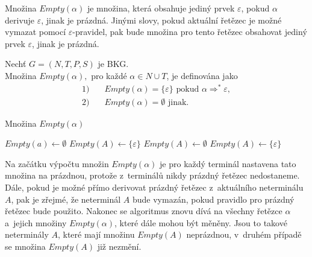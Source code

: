Množina $Empty(\alpha)$ je množina, která obsahuje jediný prvek $\varepsilon$, pokud $\alpha$ derivuje $\varepsilon$, jinak je prázdná.
Jinými slovy, pokud aktuální řetězec je možné vymazat pomocí $\varepsilon$-pravidel, pak bude množina pro tento řetězec obsahovat jediný prvek $\varepsilon$, jinak je prázdná.
\begin{definition}\label{def_mnozina_empty}
    Nechť $G = (N, T, P, S)$ je BKG. \\
    Množina $Empty(\alpha),$ pro každé $\alpha \in N \cup T$, je definována jako
    \begin{align*}
        1) & \quad Empty(\alpha) = \{\varepsilon\} \text{ pokud } \alpha \Rightarrow^* \varepsilon, \\
        2) & \quad Empty(\alpha) = \emptyset \text{ jinak}.
    \end{align*}
\end{definition}
\begin{algorithm}
    \caption{Množina $Empty(\alpha)$}
    \label{alg_mnozina_empty}
    \begin{algorithmic}[1]
        \NewLine
            \State $Empty(a) \gets \emptyset$
        \EndFor
                \State $Empty(A) \gets \{\varepsilon\}$
            \Else
                \State $Empty(A) \gets \emptyset$
            \EndIf
        \EndFor
                \State $Empty(A) \gets \{\varepsilon\}$
            \EndIf
        \EndWhile
    \end{algorithmic}
\end{algorithm}
Na začátku výpočtu množin $Empty(\alpha)$ je pro každý terminál nastavena tato množina na prázdnou, protože z~terminálů nikdy prázdný řetězec nedostaneme.
Dále, pokud je možné přímo derivovat prázdný řetězec z~aktuálního neterminálu $A$, pak je zřejmé, že neterminál $A$ bude vymazán, pokud pravidlo pro prázdný řetězec bude použito.
Nakonec se algoritmus znovu dívá na všechny řetězce $\alpha$ a~jejich množiny $Empty(\alpha)$, které dále mohou být měněny.
Jsou to takové neterminály $A$, které mají množinu $Empty(A)$ neprázdnou, v~druhém případě se množina $Empty(A)$ již nezmění.

